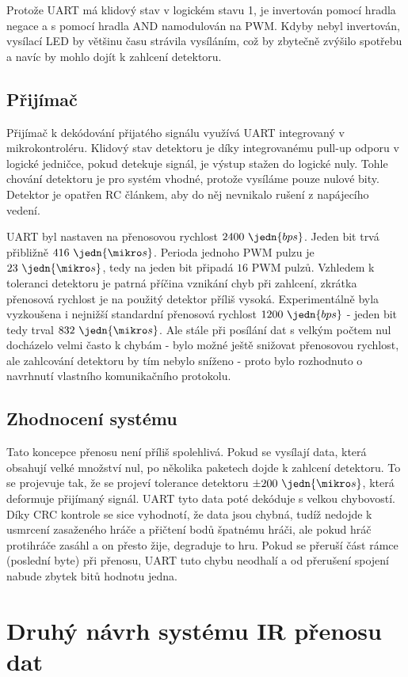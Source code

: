 Protože UART má klidový stav v logickém stavu 1, je invertován pomocí hradla negace a s pomocí hradla AND namodulován na PWM. Kdyby nebyl invertován, vysílací LED by většinu času strávila vysíláním, což by zbytečně zvýšilo spotřebu a navíc by mohlo dojít k zahlcení detektoru.

\subsection{Přijímač}
Přijímač k dekódování přijatého signálu využívá UART integrovaný v mikrokontroléru. Klidový stav detektoru je díky integrovanému pull-up odporu v logické jedničce, pokud detekuje signál, je výstup stažen do logické nuly. Tohle chování detektoru je pro systém vhodné, protože vysíláme pouze nulové bity. Detektor je opatřen RC článkem, aby do něj nevnikalo rušení z napájecího vedení.

UART byl nastaven na přenosovou rychlost $2400~\jedn{bps}$. Jeden bit trvá přibližně $416~\jedn{\mikro s}$. Perioda jednoho PWM pulzu je $23~\jedn{\mikro s}$, tedy na jeden bit připadá $16$ PWM pulzů. Vzhledem k toleranci detektoru je patrná příčina vznikání chyb při zahlcení, zkrátka přenosová rychlost je na použitý detektor příliš vysoká. Experimentálně byla vyzkoušena i nejnižší standardní přenosová rychlost $1200~\jedn{bps}$ - jeden bit tedy trval $832~\jedn{\mikro s}$. Ale stále při posílání dat s velkým počtem nul docházelo velmi často k chybám - bylo možné ještě snižovat přenosovou rychlost, ale zahlcování detektoru by tím nebylo sníženo - proto bylo rozhodnuto o navrhnutí vlastního komunikačního protokolu.

\subsection{Zhodnocení systému}
Tato koncepce přenosu není příliš spolehlivá. Pokud se vysílají data, která obsahují velké množství nul, po několika paketech dojde k zahlcení detektoru. To se projevuje tak, že se projeví tolerance detektoru $\pm200~\jedn{\mikro s}$, která deformuje přijímaný signál. UART tyto data poté dekóduje s velkou chybovostí. Díky CRC kontrole se sice vyhodnotí, že data jsou chybná, tudíž nedojde k usmrcení zasaženého hráče a přičtení bodů špatnému hráči, ale pokud hráč protihráče zasáhl a on přesto žije, degraduje to hru. Pokud se přeruší část rámce (poslední byte) při přenosu, UART tuto chybu neodhalí a od přerušení spojení nabude zbytek bitů hodnotu jedna.

\section{Druhý návrh systému IR přenosu dat}

